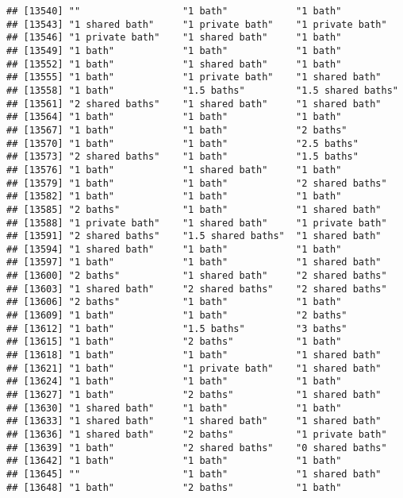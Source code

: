\documentclass[
]{article}
\begin{document}
\begin{verbatim}
## [13540] ""                  "1 bath"            "1 bath"           
## [13543] "1 shared bath"     "1 private bath"    "1 private bath"   
## [13546] "1 private bath"    "1 shared bath"     "1 bath"           
## [13549] "1 bath"            "1 bath"            "1 bath"           
## [13552] "1 bath"            "1 shared bath"     "1 bath"           
## [13555] "1 bath"            "1 private bath"    "1 shared bath"    
## [13558] "1 bath"            "1.5 baths"         "1.5 shared baths" 
## [13561] "2 shared baths"    "1 shared bath"     "1 shared bath"    
## [13564] "1 bath"            "1 bath"            "1 bath"           
## [13567] "1 bath"            "1 bath"            "2 baths"          
## [13570] "1 bath"            "1 bath"            "2.5 baths"        
## [13573] "2 shared baths"    "1 bath"            "1.5 baths"        
## [13576] "1 bath"            "1 shared bath"     "1 bath"           
## [13579] "1 bath"            "1 bath"            "2 shared baths"   
## [13582] "1 bath"            "1 bath"            "1 bath"           
## [13585] "2 baths"           "1 bath"            "1 shared bath"    
## [13588] "1 private bath"    "1 shared bath"     "1 private bath"   
## [13591] "2 shared baths"    "1.5 shared baths"  "1 shared bath"    
## [13594] "1 shared bath"     "1 bath"            "1 bath"           
## [13597] "1 bath"            "1 bath"            "1 shared bath"    
## [13600] "2 baths"           "1 shared bath"     "2 shared baths"   
## [13603] "1 shared bath"     "2 shared baths"    "2 shared baths"   
## [13606] "2 baths"           "1 bath"            "1 bath"           
## [13609] "1 bath"            "1 bath"            "2 baths"          
## [13612] "1 bath"            "1.5 baths"         "3 baths"          
## [13615] "1 bath"            "2 baths"           "1 bath"           
## [13618] "1 bath"            "1 bath"            "1 shared bath"    
## [13621] "1 bath"            "1 private bath"    "1 shared bath"    
## [13624] "1 bath"            "1 bath"            "1 bath"           
## [13627] "1 bath"            "2 baths"           "1 shared bath"    
## [13630] "1 shared bath"     "1 bath"            "1 bath"           
## [13633] "1 shared bath"     "1 shared bath"     "1 shared bath"    
## [13636] "1 shared bath"     "2 baths"           "1 private bath"   
## [13639] "1 bath"            "2 shared baths"    "0 shared baths"   
## [13642] "1 bath"            "1 bath"            "1 bath"           
## [13645] ""                  "1 bath"            "1 shared bath"    
## [13648] "1 bath"            "2 baths"           "1 bath"           

\end{verbatim}
\end{document}

